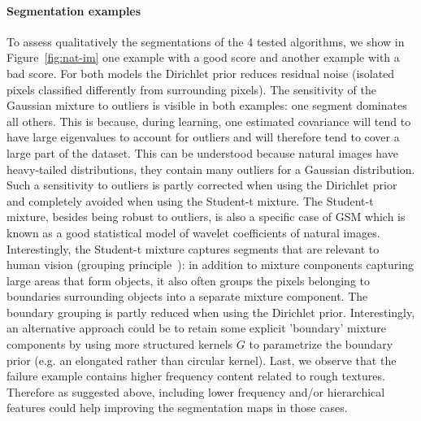 \documentclass[a4paper,12pt]{article}
\begin{document}
\paragraph{Segmentation examples} To assess qualitatively the segmentations of the 4 tested algorithms, we show in Figure~\ref{fig:nat-im} one example with a good score and another example with a bad score. For both models the Dirichlet prior reduces residual noise (isolated pixels classified differently from surrounding pixels). The sensitivity of the Gaussian mixture to outliers is visible in both examples: one segment dominates all others. This is because, during learning, one estimated covariance will tend to have large eigenvalues to account for outliers and will therefore tend to cover a large part of the dataset.
%
%
This can be understood because natural images have heavy-tailed distributions, \ie they contain many outliers for a Gaussian distribution. Such a sensitivity to outliers is partly corrected when using the Dirichlet prior and completely avoided when using the Student-t mixture. The Student-t mixture, besides being robust to outliers, is also a specific case of GSM which is known as a good statistical model of wavelet coefficients of natural images. Interestingly, the Student-t mixture captures segments that are relevant to human vision (grouping principle~\cite{wagemans2012century}): in addition to mixture components capturing large areas that form objects, it also often groups the pixels belonging to boundaries surrounding objects into a separate mixture component. The boundary grouping is partly reduced when using the Dirichlet prior. Interestingly, an alternative approach could be to retain some explicit 'boundary' mixture components by using more structured kernels $G$ to parametrize the boundary prior (e.g. an elongated rather than circular kernel). Last, we observe that the failure example contains higher frequency content related to rough textures. Therefore as suggested above, including lower frequency and/or hierarchical features could help improving the segmentation maps in those cases. 
\end{document}
